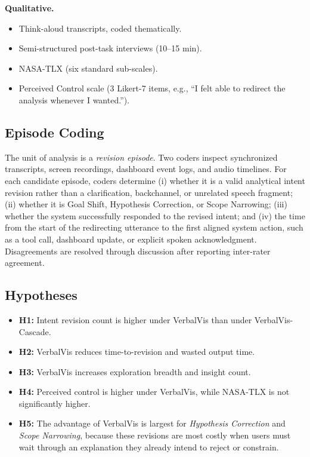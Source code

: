 \documentclass[journal]{IEEEtran}
\begin{document}
\textbf{Qualitative.}
\begin{itemize}
\item Think-aloud transcripts, coded thematically.
\item Semi-structured post-task interviews (10--15 min).
\item NASA-TLX (six standard sub-scales).
\item Perceived Control scale (3 Likert-7 items, e.g., ``I felt able to redirect the analysis whenever I wanted.'').
\end{itemize}

\subsection{Episode Coding}
The unit of analysis is a \emph{revision episode}. Two coders inspect synchronized transcripts, screen recordings, dashboard event logs, and audio timelines. For each candidate episode, coders determine (i) whether it is a valid analytical intent revision rather than a clarification, backchannel, or unrelated speech fragment; (ii) whether it is Goal Shift, Hypothesis Correction, or Scope Narrowing; (iii) whether the system successfully responded to the revised intent; and (iv) the time from the start of the redirecting utterance to the first aligned system action, such as a tool call, dashboard update, or explicit spoken acknowledgment. Disagreements are resolved through discussion after reporting inter-rater agreement.

\subsection{Hypotheses}
\begin{itemize}
\item \textbf{H1:} Intent revision count is higher under VerbalVis than under VerbalVis-Cascade.
\item \textbf{H2:} VerbalVis reduces time-to-revision and wasted output time.
\item \textbf{H3:} VerbalVis increases exploration breadth and insight count.
\item \textbf{H4:} Perceived control is higher under VerbalVis, while NASA-TLX is not significantly higher.
\item \textbf{H5:} The advantage of VerbalVis is largest for \emph{Hypothesis Correction} and \emph{Scope Narrowing}, because these revisions are most costly when users must wait through an explanation they already intend to reject or constrain.
\end{itemize}
\end{document}
